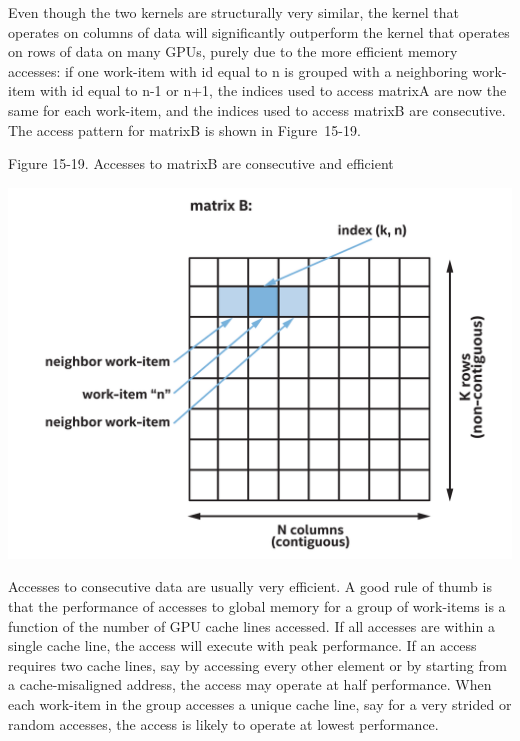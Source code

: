 Even though the two kernels are structurally very similar, the kernel that operates on columns of data will significantly outperform the kernel that operates on rows of data on many GPUs, purely due to the more efficient memory accesses: if one work-item with id equal to n is grouped with a neighboring work-item with id equal to n-1 or n+1, the indices used to access matrixA are now the same for each work-item, and the indices used to access matrixB are consecutive. The access pattern for matrixB is shown in Figure 15-19.\par

\hspace*{\fill} \par %
Figure 15-19. Accesses to matrixB are consecutive and efficient
\begin{center}
	\includegraphics[width=1.0\textwidth]{content/chapter-15/images/14}
\end{center}

Accesses to consecutive data are usually very efficient. A good rule of thumb is that the performance of accesses to global memory for a group of work-items is a function of the number of GPU cache lines accessed. If all accesses are within a single cache line, the access will execute with peak performance. If an access requires two cache lines, say by accessing every other element or by starting from a cache-misaligned address, the access may operate at half performance. When each work-item in the group accesses a unique cache line, say for a very strided or random accesses, the access is likely to operate at lowest performance.\par

